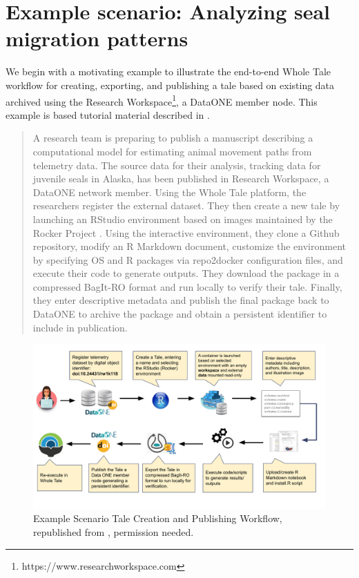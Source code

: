 \documentclass[conference]{IEEEtran}
\begin{document}
\section{Example scenario: Analyzing seal migration patterns} \label{scenario}
We begin with a motivating example to illustrate the end-to-end Whole Tale workflow for creating, exporting, and publishing a tale based on existing data archived using the Research Workspace\footnote{https://www.researchworkspace.com}, 
a DataONE member node. This example is based tutorial material described in \cite{london2018}.

\begin{quote}
A research team is preparing to publish a manuscript describing a computational model for 
estimating animal movement paths from telemetry data. The source data for their analysis, 
tracking data for juvenile seals in Alaska\cite{cameron2018}, has been published in Research 
Workspace, a DataONE network member. Using the Whole Tale platform, the researchers register the 
external dataset. They then create a new tale by launching an RStudio environment based on 
images maintained by the Rocker Project \cite{boettiger2018}. Using the interactive environment, 
they clone a Github repository, modify an R Markdown document, customize the environment by 
specifying OS and R packages via repo2docker configuration files, and execute their code to 
generate outputs. They download the package in a compressed BagIt-RO format and run locally to 
verify their tale. Finally, they enter descriptive metadata and publish the final 
package back to DataONE to archive the package and obtain a persistent identifier to include in publication. 
\end{quote}


\begin{figure}
\centering
\includegraphics[scale=0.6]{images/wholetale-workflow.pdf}
\caption{Example Scenario Tale Creation and Publishing Workflow, republished from \cite{chard2019}, permission needed.}
\end{figure}
\label{example}
\end{document}
